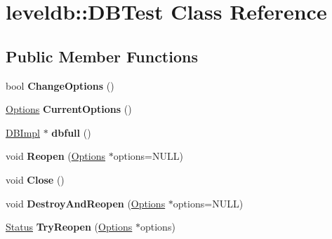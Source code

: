 \hypertarget{classleveldb_1_1_d_b_test}{}\section{leveldb\+::D\+B\+Test Class Reference}
\label{classleveldb_1_1_d_b_test}
\subsection*{Public Member Functions}
\begin{DoxyCompactItemize}
\item 
\mbox{\label{classleveldb_1_1_d_b_test_a587534fe403016f15cf1997ef7a40836}} 
bool {\bfseries Change\+Options} ()
\item 
\mbox{\label{classleveldb_1_1_d_b_test_a68db410e16195a3b67822bec05c06547}} 
\mbox{\hyperlink{structleveldb_1_1_options}{Options}} {\bfseries Current\+Options} ()
\item 
\mbox{\label{classleveldb_1_1_d_b_test_a67de35d247ea077c1e4fdf2a7a0f0514}} 
\mbox{\hyperlink{classleveldb_1_1_d_b_impl}{D\+B\+Impl}} $\ast$ {\bfseries dbfull} ()
\item 
\mbox{\label{classleveldb_1_1_d_b_test_a38170a082cbc71fb446408ff5634c797}} 
void {\bfseries Reopen} (\mbox{\hyperlink{structleveldb_1_1_options}{Options}} $\ast$options=N\+U\+LL)
\item 
\mbox{\label{classleveldb_1_1_d_b_test_aee76446bbb9c34cdb1ae00318689aead}} 
void {\bfseries Close} ()
\item 
\mbox{\label{classleveldb_1_1_d_b_test_ab798a43e7feab6dddc8fa1eb7a5f61f6}} 
void {\bfseries Destroy\+And\+Reopen} (\mbox{\hyperlink{structleveldb_1_1_options}{Options}} $\ast$options=N\+U\+LL)
\item 
\mbox{\label{classleveldb_1_1_d_b_test_aee588b2d13db6be2a651a8fabeac5c79}} 
\mbox{\hyperlink{classleveldb_1_1_status}{Status}} {\bfseries Try\+Reopen} (\mbox{\hyperlink{structleveldb_1_1_options}{Options}} $\ast$options)
\item 

\end{DoxyCompactItemize}
